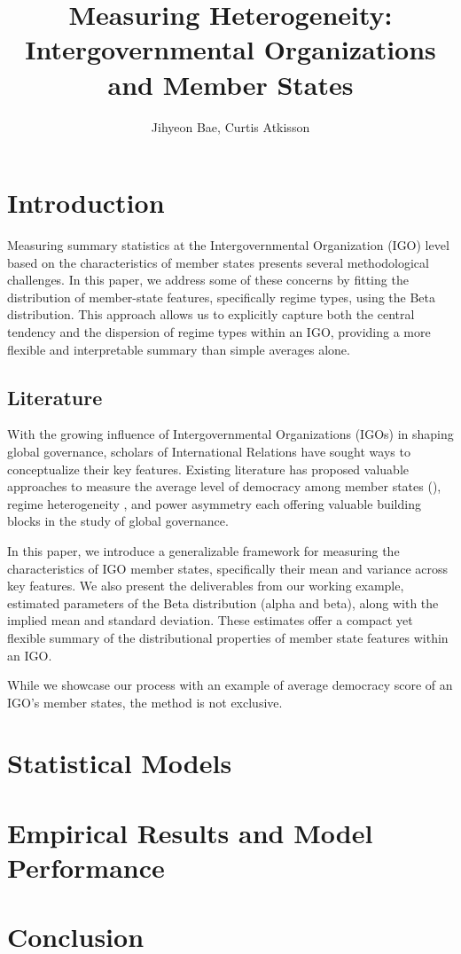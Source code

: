 \documentclass[12pt]{article}
\title{Measuring Heterogeneity: Intergovernmental Organizations and Member States}
\author{Jihyeon Bae, Curtis Atkisson}
\date{}
\begin{document}
\maketitle

\begin{abstract}

\end{abstract}

\section{Introduction}
Measuring summary statistics at the Intergovernmental Organization (IGO) level based on the characteristics of member states presents several methodological challenges. In this paper, we address some of these concerns by fitting the distribution of member-state features, specifically regime types, using the Beta distribution. This approach allows us to explicitly capture both the central tendency and the dispersion of regime types within an IGO, providing a more flexible and interpretable summary than simple averages alone.


\subsection{Literature}

With the growing influence of Intergovernmental Organizations (IGOs) in shaping global governance, scholars of International Relations have sought ways to conceptualize their key features. Existing literature has proposed valuable approaches to measure the average level of democracy among member states (), regime heterogeneity \parencite{bae_regime-type_2025}, and power asymmetry \parencite{allee_why_2016} each offering valuable building blocks in the study of global governance.

In this paper, we introduce a generalizable framework for measuring the characteristics of IGO member states, specifically their mean and variance across key features. We also present the deliverables from our working example, estimated parameters of the Beta distribution (alpha and beta), along with the implied mean and standard deviation. These estimates offer a compact yet flexible summary of the distributional properties of member state features within an IGO. 

While we showcase our process with an example of average democracy score of an IGO's member states, the method is not exclusive. 




\section{Statistical Models}


\section{Empirical Results and Model Performance}

\section{Conclusion}


\begin{appendices}


\end{appendices}

\printbibliography
\end{document}
